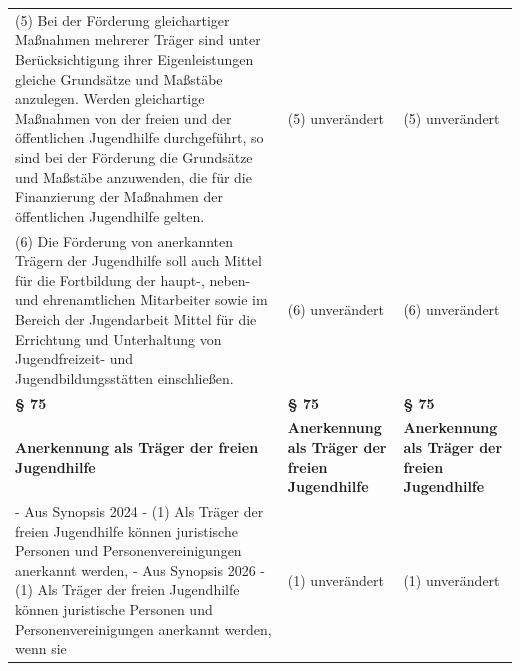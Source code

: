 \documentclass[10pt,a4paper,landscape]{article}
\begin{document}
\begin{longtable}{|L{8.2cm}|L{8.2cm}|L{8.2cm}|}
\hhline{|---|}
(5) Bei der Förderung gleichartiger  \newline Maßnahmen mehrerer Träger sind unter  \newline Berücksichtigung ihrer Eigenleistungen  \newline gleiche Grundsätze und Maßstäbe  \newline anzulegen. Werden gleichartige  \newline Maßnahmen von der freien und der  \newline öffentlichen Jugendhilfe durchgeführt, so  \newline sind bei der Förderung die Grundsätze und  \newline Maßstäbe anzuwenden, die für die  \newline Finanzierung der Maßnahmen der  \newline öffentlichen Jugendhilfe gelten. & (5) unverändert & (5) unverändert \\
\hhline{|---|}
(6) Die Förderung von anerkannten  \newline Trägern der Jugendhilfe soll auch Mittel für  \newline die Fortbildung der haupt-, neben- und  \newline ehrenamtlichen Mitarbeiter sowie im  \newline Bereich der Jugendarbeit Mittel für die  \newline Errichtung und Unterhaltung von  \newline Jugendfreizeit- und Jugendbildungsstätten  \newline einschließen. & (6) unverändert & (6) unverändert \\
\hhline{|---|}
\textbf{\S{} 75} & \textbf{\S{} 75} & \textbf{\S{} 75} \\
\hhline{|---|}
\textbf{Anerkennung als Träger der freien  \newline Jugendhilfe} & \textbf{Anerkennung als Träger der freien  \newline Jugendhilfe} & \textbf{Anerkennung als Träger der freien  \newline Jugendhilfe} \\
\hhline{|---|}
- Aus Synopsis 2024 - \newline (1) Als Träger der freien Jugendhilfe  \newline können juristische Personen und  \newline Personenvereinigungen anerkannt werden,  \newline - Aus Synopsis 2026 - \newline (1) Als Träger der freien Jugendhilfe  \newline können juristische Personen und  \newline Personenvereinigungen anerkannt werden,  \newline wenn sie & (1) unverändert & (1) unverändert \\

\end{longtable}
\end{document}
